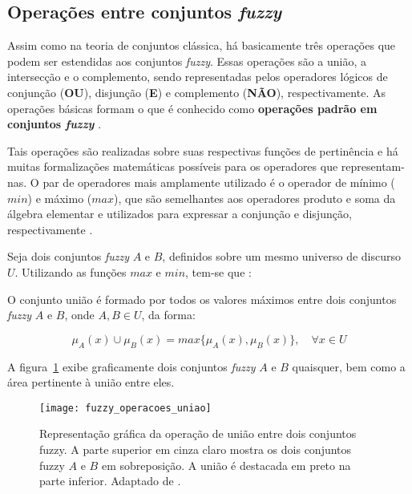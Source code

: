 \subsection{Operações entre conjuntos \emph{fuzzy}}
\label{sec:operacoes_conjuntos_fuzzy}

Assim como na teoria de conjuntos clássica, há basicamente três operações que podem ser estendidas aos conjuntos \emph{fuzzy}. Essas operações são a união, a intersecção e o complemento, sendo representadas pelos operadores lógicos de conjunção (\textbf{OU}), disjunção (\textbf{E}) e complemento (\textbf{NÃO}), respectivamente. As operações básicas formam o que é conhecido como \textbf{operações padrão em conjuntos \emph{fuzzy}} \citep{klir:95}.

Tais operações são realizadas sobre suas respectivas funções de pertinência e há muitas formalizações matemáticas possíveis para os operadores que representam-nas. O par de operadores mais amplamente utilizado é o operador de mínimo ($min$) e máximo ($max$), que são semelhantes aos operadores produto e soma da álgebra elementar e utilizados para expressar a conjunção e disjunção, respectivamente \citep{thole:79}.

Seja dois conjuntos \emph{fuzzy} $A$ e $B$, definidos sobre um mesmo universo de discurso $U$. Utilizando as funções $max$ e $min$, tem-se que \citep{klir:95}:

\begin{defn}
\label{def:conjunto_fuzzy_uniao}
O conjunto união é formado por todos os valores máximos entre dois conjuntos \emph{fuzzy} $A$ e $B$, onde $A, B \in U$, da forma:

\begin{equation}
  \mu_A(x) \cup \mu_B(x) = max\{\mu_A(x), \mu_B(x)\}, \quad \forall x \in U
\end{equation}
\end{defn}

A figura~\ref{fig:fuzzy_operacoes_uniao} exibe graficamente dois conjuntos \emph{fuzzy} $A$ e $B$ quaisquer, bem como a área pertinente à união entre eles.

\begin{figure}[!h]
  \centering
  \texttt{[image: fuzzy\_operacoes\_uniao]}
  \caption[Operação de união entre dois conjuntos fuzzy]{Representação gráfica da operação de união entre dois conjuntos fuzzy. A parte superior em cinza claro mostra os dois conjuntos fuzzy $A$ e $B$ em sobreposição. A união é destacada em preto na parte inferior. Adaptado de \citet{vrusias:06}.}
  \label{fig:fuzzy_operacoes_uniao}
\end{figure}

